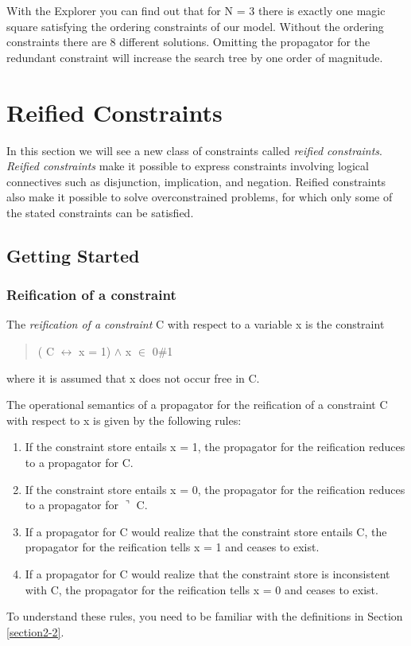 \documentclass[a4paper,halfparskip]{scrartcl}
\begin{document}
With the Explorer you can find out that for N = 3 
there is exactly one magic square satisfying the ordering 
constraints of our model. Without the ordering constraints 
there are 8 different solutions. Omitting the propagator for 
the redundant constraint will increase the search tree by one 
order of magnitude.





\newpage
\section{Reified Constraints}
In this section we will see a new class of constraints called 
\emph{reified constraints}. \emph{Reified constraints} make it possible to 
express constraints involving logical connectives such as 
disjunction, implication, and negation. Reified constraints 
also make it possible to solve overconstrained problems, 
for which only some of the stated constraints can be satisfied. 

\subsection{Getting Started}
\subsubsection{Reification of a constraint}
The \emph{reification of a constraint} C with respect to a variable
x is the constraint 
\begin{quote}
( C $ \leftrightarrow $ x = 1) $ \wedge $ x $\in $ 0$\#$1
\end{quote}
where it is assumed that x does not occur free in C.

The operational semantics of a propagator for the reification of a
constraint C with respect to x is given by the following rules:
\begin{enumerate} 
\item
If the constraint store entails x = 1, the propagator for the 
reification reduces to a propagator for C.
\item
If the constraint store entails x = 0, the propagator for the 
reification reduces to a propagator for $\urcorner$ C.
\item
If a propagator for C would realize that the constraint store entails 
C, the propagator for the reification tells x = 1 and ceases to exist.
\item
If a propagator for C would realize that the constraint store is 
inconsistent with C, the propagator for the reification tells x = 0  
and ceases to exist.
\end{enumerate}
To understand these rules, you need to be familiar with the definitions 
in Section \ref{section2-2}. 
\end{document}
